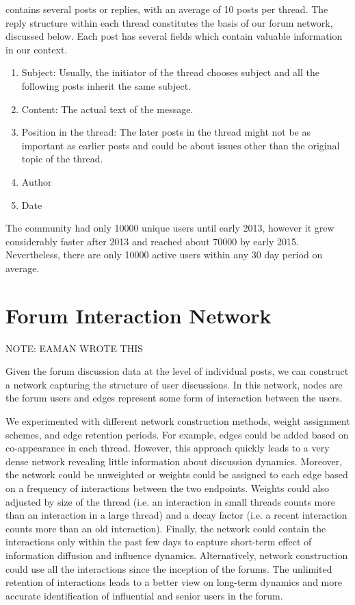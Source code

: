 contains several posts or replies, with an average of 10 posts per thread.  The
reply structure within each thread constitutes the basis of our forum network,
discussed below.  Each post has several fields which contain valuable
information in our context.
\begin{enumerate}
  \item{Subject:} Usually, the initiator of the thread chooses subject and all the
    following posts inherit the same subject.
  \item{Content:} The actual text of the message.
  \item{Position in the thread}: The later posts in the thread might not be as important
    as earlier posts and could be about issues other than the original topic of the thread.
  \item{Author}
  \item{Date}
\end{enumerate}

The community had only 10000 unique users until early 2013, however it grew
considerably faster after 2013 and reached about 70000 by early
2015. Nevertheless, there are only 10000 active users within any 30 day period on average.


\section{Forum Interaction Network}
NOTE: EAMAN WROTE THIS

Given the forum discussion data at the level of individual posts, we can construct a
network capturing the structure of user discussions.  In this network, nodes
are the forum users and edges represent some form of interaction between the
users.

We experimented with different network construction methods, weight assignment
schemes, and edge retention periods. For example, edges could be added based on
co-appearance in each thread. However, this approach quickly leads to a very
dense network revealing little information about discussion dynamics. Moreover,
the network could be unweighted or weights could be assigned to each edge based
on a frequency of interactions between the two endpoints. Weights could
also adjusted by size of the thread (i.e. an interaction in small threads counts
more than an interaction in a large thread) and a decay factor (i.e. a recent
interaction counts more than an old interaction).
Finally, the network could contain the interactions only within the past few
days to capture short-term effect of information diffusion and influence
dynamics. Alternatively, network construction could use all the interactions
since the inception of the forums. The unlimited retention of interactions
leads to a better view on long-term dynamics and more accurate identification
of influential and senior users in the forum.


